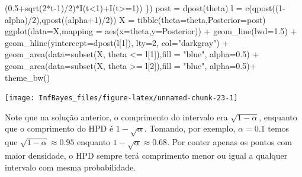 \documentclass[
]{book}
\newenvironment{Shaded}{\begin{snugshade}}{\end{snugshade}}
\newcommand{\AttributeTok}[1]{\textcolor[rgb]{0.77,0.63,0.00}{#1}}
\newcommand{\DecValTok}[1]{\textcolor[rgb]{0.00,0.00,0.81}{#1}}
\newcommand{\FloatTok}[1]{\textcolor[rgb]{0.00,0.00,0.81}{#1}}
\newcommand{\FunctionTok}[1]{\textcolor[rgb]{0.00,0.00,0.00}{#1}}
\newcommand{\NormalTok}[1]{#1}
\newcommand{\OtherTok}[1]{\textcolor[rgb]{0.56,0.35,0.01}{#1}}
\newcommand{\SpecialCharTok}[1]{\textcolor[rgb]{0.00,0.00,0.00}{#1}}
\newcommand{\StringTok}[1]{\textcolor[rgb]{0.31,0.60,0.02}{#1}}
\begin{document}
\begin{Shaded}
\begin{Highlighting}[]
\NormalTok{    (}\FloatTok{0.5}\SpecialCharTok{+}\FunctionTok{sqrt}\NormalTok{(}\DecValTok{2}\SpecialCharTok{*}\NormalTok{t}\DecValTok{{-}1}\NormalTok{)}\SpecialCharTok{/}\DecValTok{2}\NormalTok{)}\SpecialCharTok{*}\FunctionTok{I}\NormalTok{(t}\SpecialCharTok{\textless{}}\DecValTok{1}\NormalTok{)}\SpecialCharTok{+}\FunctionTok{I}\NormalTok{(t}\SpecialCharTok{\textgreater{}=}\DecValTok{1}\NormalTok{)) \})}
\NormalTok{post }\OtherTok{=} \FunctionTok{dpost}\NormalTok{(theta)}
\NormalTok{l }\OtherTok{=} \FunctionTok{c}\NormalTok{(}\FunctionTok{qpost}\NormalTok{((}\DecValTok{1}\SpecialCharTok{{-}}\NormalTok{alpha)}\SpecialCharTok{/}\DecValTok{2}\NormalTok{),}\FunctionTok{qpost}\NormalTok{((alpha}\SpecialCharTok{+}\DecValTok{1}\NormalTok{)}\SpecialCharTok{/}\DecValTok{2}\NormalTok{))}
\NormalTok{X }\OtherTok{=} \FunctionTok{tibble}\NormalTok{(}\AttributeTok{theta=}\NormalTok{theta,}\AttributeTok{Posterior=}\NormalTok{post)}
\FunctionTok{ggplot}\NormalTok{(}\AttributeTok{data=}\NormalTok{X,}\AttributeTok{mapping =} \FunctionTok{aes}\NormalTok{(}\AttributeTok{x=}\NormalTok{theta,}\AttributeTok{y=}\NormalTok{Posterior)) }\SpecialCharTok{+}
  \FunctionTok{geom\_line}\NormalTok{(}\AttributeTok{lwd=}\FloatTok{1.5}\NormalTok{) }\SpecialCharTok{+}
  \FunctionTok{geom\_hline}\NormalTok{(}\AttributeTok{yintercept=}\FunctionTok{dpost}\NormalTok{(l[}\DecValTok{1}\NormalTok{]), }\AttributeTok{lty=}\DecValTok{2}\NormalTok{, }\AttributeTok{col=}\StringTok{"darkgray"}\NormalTok{) }\SpecialCharTok{+}
  \FunctionTok{geom\_area}\NormalTok{(}\AttributeTok{data=}\FunctionTok{subset}\NormalTok{(X, theta }\SpecialCharTok{\textless{}=}\NormalTok{ l[}\DecValTok{1}\NormalTok{]),}\AttributeTok{fill =} \StringTok{"blue"}\NormalTok{, }\AttributeTok{alpha=}\FloatTok{0.5}\NormalTok{) }\SpecialCharTok{+}
  \FunctionTok{geom\_area}\NormalTok{(}\AttributeTok{data=}\FunctionTok{subset}\NormalTok{(X, theta }\SpecialCharTok{\textgreater{}=}\NormalTok{ l[}\DecValTok{2}\NormalTok{]),}\AttributeTok{fill =} \StringTok{"blue"}\NormalTok{, }\AttributeTok{alpha=}\FloatTok{0.5}\NormalTok{)}\SpecialCharTok{+}
  \FunctionTok{theme\_bw}\NormalTok{()}
\end{Highlighting}
\end{Shaded}

\begin{center}\texttt{[image: InfBayes\_files/figure-latex/unnamed-chunk-23-1]} \end{center}

Note que na solução anterior, o comprimento do intervalo era \(\sqrt{1-\alpha}\), enquanto que o comprimento do HPD é \(1-\sqrt{\alpha}\). Tomando, por exemplo, \(\alpha=0.1\) temos que \(\sqrt{1-\alpha} \approx 0.95\) enquanto \(1-\sqrt{\alpha}\approx 0.68\). Por conter apenas os pontos com maior densidade, o HPD sempre terá comprimento menor ou igual a qualquer intervalo com mesma probabilidade.
\end{document}

